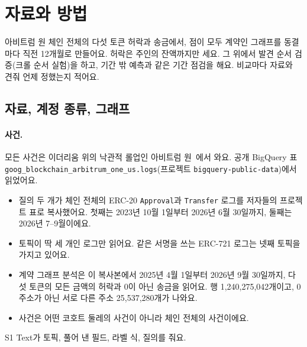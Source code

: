 \section{자료와 방법}

\begin{yoji}
아비트럼 원 체인 전체의 다섯 토큰 허락과 송금에서, 점이 모두 계약인 그래프를 동결마다 직전 12개월로 만들어요. 허락은 주인의 잔액까지만 세요. 그 위에서 발견 순서 검증(크롤 순서 실험)을 하고, 기간 밖 예측과 같은 기간 점검을 해요. 비교마다 자료와 견줘 언제 정했는지 적어요.
\end{yoji}

\subsection{자료, 계정 종류, 그래프}
\label{sec:data}

\paragraph{사건.}
모든 사건은 이더리움 위의 낙관적 롤업인 아비트럼 원~\cite{kalodner2018arbitrum}에서 와요. 공개 BigQuery 표 \texttt{goog\_blockchain\_arbitrum\_one\_us.logs}(프로젝트 \texttt{bigquery-public-data})에서 읽었어요.
\begin{itemize}
\item 질의 두 개가 체인 전체의 ERC-20 \texttt{Approval}과 \texttt{Transfer} 로그를 저자들의 프로젝트 표로 복사했어요. 첫째는 2023년 10월 1일부터 2026년 6월 30일까지, 둘째는 2026년 7–9월이에요.
\item 토픽이 딱 세 개인 로그만 읽어요. 같은 서명을 쓰는 ERC-721 로그는 넷째 토픽을 가지고 있어요.
\item 계약 그래프 분석은 이 복사본에서 2025년 4월 1일부터 2026년 9월 30일까지, 다섯 토큰의 모든 금액의 허락과 0이 아닌 송금을 읽어요. 행 1,240,275,042개이고, 0 주소가 아닌 서로 다른 주소 25,537,280개가 나와요.
\item 사건은 어떤 코호트 둘레의 사건이 아니라 체인 전체의 사건이에요.
\end{itemize}
S1 Text가 토픽, 풀어 낸 필드, 라벨 식, 질의를 줘요.

